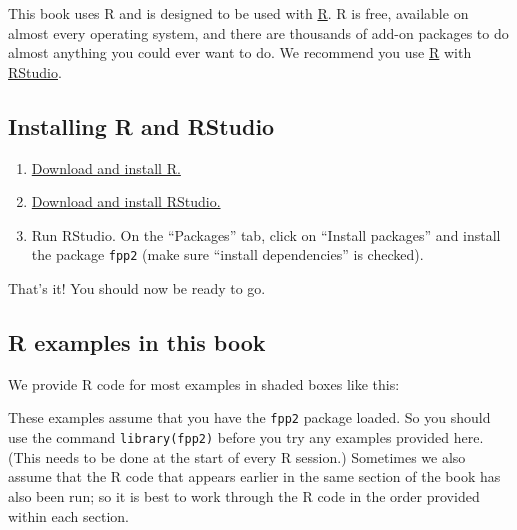 \documentclass[]{book}
\newenvironment{Shaded}{\begin{snugshade}}{\end{snugshade}}
\newcommand{\KeywordTok}[1]{\textcolor[rgb]{0.13,0.29,0.53}{\textbf{#1}}}
\newcommand{\NormalTok}[1]{#1}
\newcommand{\OperatorTok}[1]{\textcolor[rgb]{0.81,0.36,0.00}{\textbf{#1}}}
\newcommand{\StringTok}[1]{\textcolor[rgb]{0.31,0.60,0.02}{#1}}
\providecommand{\tightlist}{%
  \setlength{\itemsep}{0pt}\setlength{\parskip}{0pt}}
\begin{document}
This book uses R and is designed to be used with \href{http://www.r-project.org/}{R}. R is free, available on almost every operating system, and there are thousands of add-on packages to do almost anything you could ever want to do. We recommend you use \href{http://www.r-project.org/}{R} with \href{http://rstudio.org/}{RStudio}.

\hypertarget{installing-r-and-rstudio}{%
\subsection*{Installing R and RStudio}\label{installing-r-and-rstudio}}

\begin{enumerate}
\def\labelenumi{\arabic{enumi}.}
\tightlist
\item
  \href{http://cran.r-project.org/}{Download and install R.}
\item
  \href{https://www.rstudio.com/products/rstudio/download/\#download}{Download and install RStudio.}
\item
  Run RStudio. On the ``Packages'' tab, click on ``Install packages'' and install the package \texttt{fpp2} (make sure ``install dependencies'' is checked).
\end{enumerate}

That's it! You should now be ready to go.

\hypertarget{r-examples-in-this-book}{%
\subsection*{R examples in this book}\label{r-examples-in-this-book}}

We provide R code for most examples in shaded boxes like this:

\begin{Shaded}
\end{Shaded}

These examples assume that you have the \texttt{fpp2} package loaded. So you should use the command \texttt{library(fpp2)} before you try any examples provided here. (This needs to be done at the start of every R session.) Sometimes we also assume that the R code that appears earlier in the same section of the book has also been run; so it is best to work through the R code in the order provided within each section.
\end{document}
